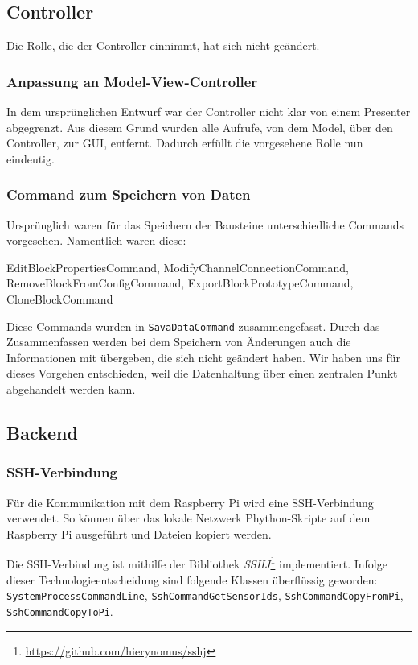 \documentclass[parskip=full]{scrartcl}
\begin{document}
\subsection{Controller}

Die Rolle, die der Controller einnimmt, hat sich nicht geändert.

\subsubsection{Anpassung an Model-View-Controller}
In dem ursprünglichen Entwurf war der Controller nicht klar von einem \gls{Presenter} abgegrenzt. Aus diesem Grund wurden alle Aufrufe, von dem Model, über den Controller, zur GUI, entfernt. Dadurch erfüllt die vorgesehene Rolle nun eindeutig.

\subsubsection{Command zum Speichern von Daten}
Ursprünglich waren für das Speichern der Bausteine unterschiedliche Commands vorgesehen. Namentlich waren diese:

    EditBlockPropertiesCommand, ModifyChannelConnectionCommand, RemoveBlockFromConfigCommand, ExportBlockPrototypeCommand, CloneBlockCommand

Diese Commands wurden in \verb|SavaDataCommand| zusammengefasst. Durch das Zusammenfassen werden bei dem Speichern von Änderungen auch die Informationen mit übergeben, die sich nicht geändert haben. Wir haben uns für dieses Vorgehen entschieden, weil die Datenhaltung über einen zentralen Punkt abgehandelt werden kann.

\subsection{Backend}

\subsubsection{SSH-Verbindung}

Für die Kommunikation mit dem Raspberry Pi wird eine SSH-Verbindung verwendet. So können über das lokale Netzwerk Phython-Skripte auf dem Raspberry Pi ausgeführt und Dateien kopiert werden.

Die SSH-Verbindung ist mithilfe der Bibliothek \textit{SSHJ}\footnote{\url{https://github.com/hierynomus/sshj}} implementiert. Infolge dieser Technologieentscheidung sind folgende Klassen überflüssig geworden: \verb:SystemProcessCommandLine:, \verb:SshCommandGetSensorIds:, \verb:SshCommandCopyFromPi:, \verb:SshCommandCopyToPi:.
\end{document}
